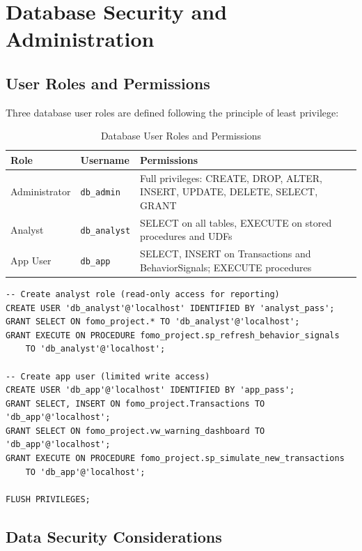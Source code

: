 \chapter{Database Security and Administration}
\label{chap:security}

\section{User Roles and Permissions}

Three database user roles are defined following the principle of least privilege:

\begin{table}[H]
    \centering
    \caption{Database User Roles and Permissions}
    \begin{tabular}{llp{7cm}}
        \toprule
        \textbf{Role} & \textbf{Username} & \textbf{Permissions} \\
        \midrule
        Administrator & \texttt{db\_admin} & Full privileges: CREATE, DROP, ALTER, INSERT, UPDATE, DELETE, SELECT, GRANT \\
        Analyst & \texttt{db\_analyst} & SELECT on all tables, EXECUTE on stored procedures and UDFs \\
        App User & \texttt{db\_app} & SELECT, INSERT on Transactions and BehaviorSignals; EXECUTE procedures \\
        \bottomrule
    \end{tabular}
\end{table}

\begin{lstlisting}[style=sqlstyle, caption={Role Configuration}]
-- Create analyst role (read-only access for reporting)
CREATE USER 'db_analyst'@'localhost' IDENTIFIED BY 'analyst_pass';
GRANT SELECT ON fomo_project.* TO 'db_analyst'@'localhost';
GRANT EXECUTE ON PROCEDURE fomo_project.sp_refresh_behavior_signals 
    TO 'db_analyst'@'localhost';

-- Create app user (limited write access)
CREATE USER 'db_app'@'localhost' IDENTIFIED BY 'app_pass';
GRANT SELECT, INSERT ON fomo_project.Transactions TO 'db_app'@'localhost';
GRANT SELECT ON fomo_project.vw_warning_dashboard TO 'db_app'@'localhost';
GRANT EXECUTE ON PROCEDURE fomo_project.sp_simulate_new_transactions 
    TO 'db_app'@'localhost';

FLUSH PRIVILEGES;
\end{lstlisting}

\section{Data Security Considerations}

